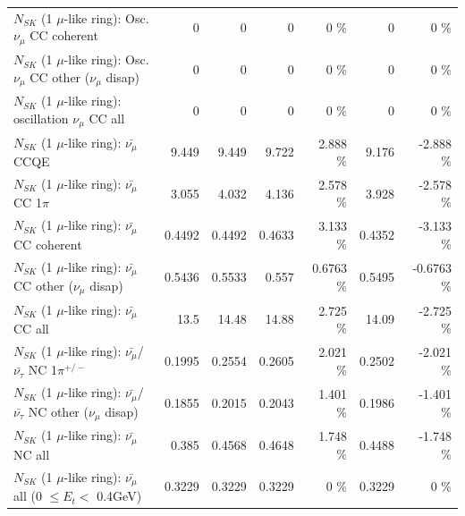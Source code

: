 \begin{table}
\begin{tabular}{| l | r | r | r  r | r  r |}
                        $N_{SK}$ (1 $\mu$-like ring): Osc. $\nu_\mu$ CC coherent &               0 &               0 &               0 &        0 \%  &               0 &        0 \%  \\ 
         $N_{SK}$ (1 $\mu$-like ring): Osc. $\nu_\mu$ CC other ($\nu_\mu$ disap) &               0 &               0 &               0 &        0 \%  &               0 &        0 \%  \\ 
                      $N_{SK}$ (1 $\mu$-like ring): oscillation $\nu_\mu$ CC all &               0 &               0 &               0 &        0 \%  &               0 &        0 \%  \\ 
\hline
\hline
                              $N_{SK}$ (1 $\mu$-like ring): $\bar{\nu_\mu}$ CCQE &           9.449 &           9.449 &           9.722 &    2.888 \%  &           9.176 &   -2.888 \%  \\ 
                         $N_{SK}$ (1 $\mu$-like ring): $\bar{\nu_\mu}$ CC 1$\pi$ &           3.055 &           4.032 &           4.136 &    2.578 \%  &           3.928 &   -2.578 \%  \\ 
                       $N_{SK}$ (1 $\mu$-like ring): $\bar{\nu_\mu}$ CC coherent &          0.4492 &          0.4492 &          0.4633 &    3.133 \%  &          0.4352 &   -3.133 \%  \\ 
        $N_{SK}$ (1 $\mu$-like ring): $\bar{\nu_\mu}$ CC other ($\nu_\mu$ disap) &          0.5436 &          0.5533 &           0.557 &   0.6763 \%  &          0.5495 &  -0.6763 \%  \\ 
                          $N_{SK}$ (1 $\mu$-like ring): $\bar{\nu_{\mu}}$ CC all &            13.5 &           14.48 &           14.88 &    2.725 \%  &           14.09 &   -2.725 \%  \\ 
\hline
  $N_{SK}$ (1 $\mu$-like ring): $\bar{\nu_\mu}$/$\bar{\nu_\tau}$ NC 1$\pi^{+/-}$ &          0.1995 &          0.2554 &          0.2605 &    2.021 \%  &          0.2502 &   -2.021 \%  \\ 
$N_{SK}$ (1 $\mu$-like ring): $\bar{\nu_\mu}$/$\bar{\nu_\tau}$ NC other ($\nu_\mu$ disap) &          0.1855 &          0.2015 &          0.2043 &    1.401 \%  &          0.1986 &   -1.401 \%  \\ 
                          $N_{SK}$ (1 $\mu$-like ring): $\bar{\nu_{\mu}}$ NC all &           0.385 &          0.4568 &          0.4648 &    1.748 \%  &          0.4488 &   -1.748 \%  \\ 
\hline
   $N_{SK}$ (1 $\mu$-like ring): $\bar{\nu_{\mu}}$ all (0 $\leq E_{t} <$ 0.4GeV) &          0.3229 &          0.3229 &          0.3229 &        0 \%  &          0.3229 &        0 \%  \\ 

\end{tabular}
\end{table}
